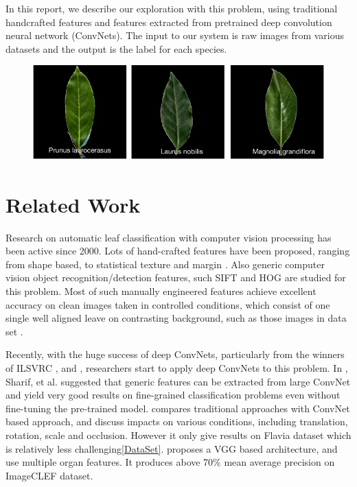 \documentclass[journal, 10pt]{IEEEtran}
\begin{document}
In this report, we describe our exploration with this problem, using traditional handcrafted features and features extracted from pretrained deep convolution neural network (ConvNets). The input to our system is raw images from various datasets and the output is the label for each species.

\begin{figure}[H]
  \centering
  \includegraphics[width=0.8\linewidth]{easilyconfused}
\end{figure}


\section{Related Work}
Research on automatic leaf classification with computer vision processing has been active since 2000. Lots of hand-crafted features have been proposed, ranging from shape based, to statistical texture and margin \cite{Charles13} \cite{Pedro13} \cite{Cho2002}. Also generic computer vision object recognition/detection features, such SIFT\cite{SIFT} and HOG\cite{HOG} are studied for this problem.  Most of such manually engineered features achieve excellent accuracy on clean images taken in controlled conditions, which consist of one single well aligned leave on contrasting background, such as those images in data set \cite{SwedishLeafDataset}.

Recently, with the huge success of deep ConvNets, particularly from the winners of ILSVRC \cite{Alex2014} \cite{VGGNetReference}, \cite{GoogleNetReference} and \cite{ResNet}, researchers start to apply deep ConvNets to this problem.  In \cite{CNNOfTheShelf}, Sharif, et al. suggested that generic features can be extracted from large ConvNet and yield very good results on fine-grained classification problems even without fine-tuning the pre-trained model.  \cite{EvaluationOfLeafConv} compares traditional approaches with ConvNet based approach, and discuss impacts on various conditions, including translation, rotation, scale and occlusion. However it only give results on Flavia\cite{FlaviaDataset} dataset which is relatively less challenging\ref{DataSet}. \cite{PlantIdentificationConv} proposes a VGG\cite{VGGNetReference} based architecture, and use multiple organ features. It produces above 70\% mean average precision on ImageCLEF dataset\cite{ImageCLEF2013}.
\end{document}
